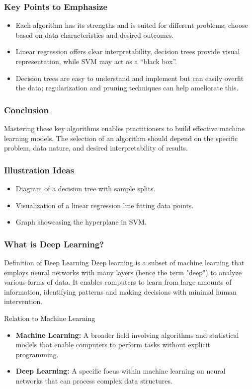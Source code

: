 \documentclass[aspectratio=169]{beamer}
\begin{document}
\begin{frame}[fragile]
    \frametitle{Key Points to Emphasize}
    \begin{itemize}
        \item Each algorithm has its strengths and is suited for different problems; choose based on data characteristics and desired outcomes.
        \item Linear regression offers clear interpretability, decision trees provide visual representation, while SVM may act as a “black box”.
        \item Decision trees are easy to understand and implement but can easily overfit the data; regularization and pruning techniques can help ameliorate this.
    \end{itemize}
\end{frame}

\begin{frame}[fragile]
    \frametitle{Conclusion}
    Mastering these key algorithms enables practitioners to build effective machine learning models. 
    The selection of an algorithm should depend on the specific problem, data nature, and desired interpretability of results.
\end{frame}

\begin{frame}[fragile]
    \frametitle{Illustration Ideas}
    \begin{itemize}
        \item Diagram of a decision tree with sample splits.
        \item Visualization of a linear regression line fitting data points.
        \item Graph showcasing the hyperplane in SVM.
    \end{itemize}
\end{frame}

\begin{frame}[fragile]
    \frametitle{What is Deep Learning?}
    \begin{block}{Definition of Deep Learning}
        Deep learning is a subset of machine learning that employs neural networks with many layers (hence the term "deep") to analyze various forms of data. It enables computers to learn from large amounts of information, identifying patterns and making decisions with minimal human intervention.
    \end{block}
    
    \begin{block}{Relation to Machine Learning}
        \begin{itemize}
            \item \textbf{Machine Learning:} A broader field involving algorithms and statistical models that enable computers to perform tasks without explicit programming.
            \item \textbf{Deep Learning:} A specific focus within machine learning on neural networks that can process complex data structures.
        \end{itemize}
    \end{block}
\end{frame}
\end{document}
